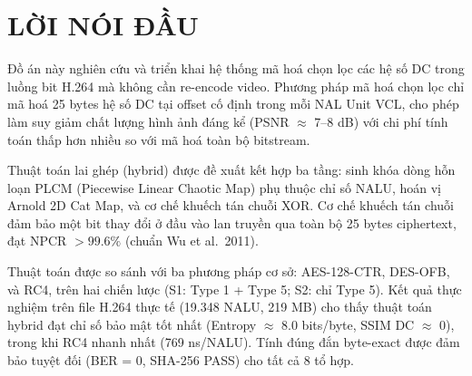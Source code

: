 \documentclass{thesis}
\begin{document}
\cleardoublepage



\section*{LỜI NÓI ĐẦU}

Đồ án này nghiên cứu và triển khai hệ thống mã hoá chọn lọc các hệ số DC trong luồng bit H.264 mà không cần re-encode video. Phương pháp mã hoá chọn lọc chỉ mã hoá 25 bytes hệ số DC tại offset cố định trong mỗi NAL Unit VCL, cho phép làm suy giảm chất lượng hình ảnh đáng kể (PSNR $\approx$ 7--8 dB) với chi phí tính toán thấp hơn nhiều so với mã hoá toàn bộ bitstream.

Thuật toán lai ghép (hybrid) được đề xuất kết hợp ba tầng: sinh khóa dòng hỗn loạn PLCM (Piecewise Linear Chaotic Map) phụ thuộc chỉ số NALU, hoán vị Arnold 2D Cat Map, và cơ chế khuếch tán chuỗi XOR. Cơ chế khuếch tán chuỗi đảm bảo một bit thay đổi ở đầu vào lan truyền qua toàn bộ 25 bytes ciphertext, đạt NPCR $> 99.6\%$ (chuẩn Wu et al.\ 2011).

Thuật toán được so sánh với ba phương pháp cơ sở: AES-128-CTR, DES-OFB, và RC4, trên hai chiến lược (S1: Type 1 + Type 5; S2: chỉ Type 5). Kết quả thực nghiệm trên file H.264 thực tế (19.348 NALU, 219 MB) cho thấy thuật toán hybrid đạt chỉ số bảo mật tốt nhất (Entropy $\approx$ 8.0 bits/byte, SSIM DC $\approx$ 0), trong khi RC4 nhanh nhất (769 ns/NALU). Tính đúng đắn byte-exact được đảm bảo tuyệt đối (BER = 0, SHA-256 PASS) cho tất cả 8 tổ hợp.

\clearpage

\end{document}
